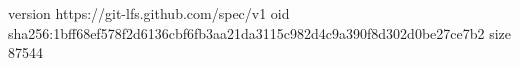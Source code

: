 version https://git-lfs.github.com/spec/v1
oid sha256:1bff68ef578f2d6136cbf6fb3aa21da3115c982d4c9a390f8d302d0be27ce7b2
size 87544

